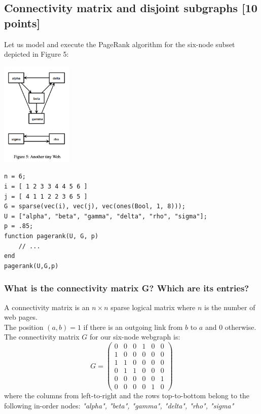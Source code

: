 \documentclass[unicode,11pt,a4paper,oneside,numbers=endperiod,openany]{scrartcl}
\begin{document}
\subsection{Connectivity matrix and disjoint subgraphs [10 points]}
Let us model and execute the PageRank algorithm for the six-node subset depicted in Figure 5:
\begin{center}
\includegraphics[height=5cm]{fig/fig5.png}
\end{center}
\hline
\begin{verbatim}
n = 6;
i = [ 1 2 3 3 4 4 5 6 ]
j = [ 4 1 1 2 2 3 6 5 ]
G = sparse(vec(i), vec(j), vec(ones(Bool, 1, 8)));
U = ["alpha", "beta", "gamma", "delta", "rho", "sigma"];
p = .85;
function pagerank(U, G, p)
    // ...
end
pagerank(U,G,p)
\end{verbatim}
\hline

\subsubsection{What is the connectivity matrix G? Which are its entries?}
A connectivity matrix is an $n\times n$ sparse logical matrix where $n$ is the number of web pages. \\
The position $(a,b) = 1$ if there is an outgoing link from $b$ to $a$ and $0$ otherwise.\\
The connectivity matrix $G$ for our six-node webgraph is:\\
$$ G = 
\begin{pmatrix}
0 & 0 & 0 & 1 & 0 & 0\\1 & 0 & 0 & 0 & 0 & 0\\1 & 1 & 0 & 0 & 0 & 0\\0 & 1 & 1 & 0 & 0 & 0\\0 & 0 & 0 & 0 & 0 & 1\\0 & 0 & 0 & 0 & 1 & 0
\end{pmatrix}
$$
where the columns from left-to-right and the rows top-to-bottom belong to the following in-order nodes: \textit{"alpha", "beta", "gamma", "delta", "rho", "sigma"}
\end{document}
